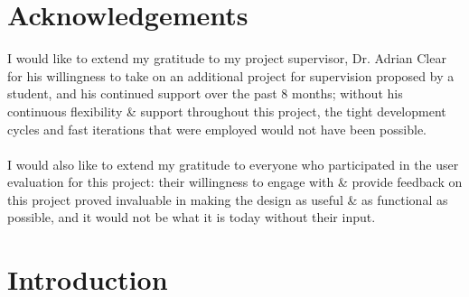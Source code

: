 \documentclass[a4paper,11pt]{report}
\begin{document}
\chapter*{Acknowledgements}
I would like to extend my gratitude to my project supervisor, Dr. Adrian Clear for his willingness to take on an additional project for supervision proposed by a student, and his continued support over the past 8 months;
without his continuous flexibility \& support throughout this project, the tight development cycles and fast iterations that were employed would not have been possible.
\\\\
I would also like to extend my gratitude to everyone who participated in the user evaluation for this project:
their willingness to engage with \& provide feedback on this project proved invaluable in making the design as useful \& as functional as possible, and it would not be what it is today without their input.


\newpage
\tableofcontents
\newpage
\setcounter{page}{1}

\chapter{Introduction}
\end{document}
